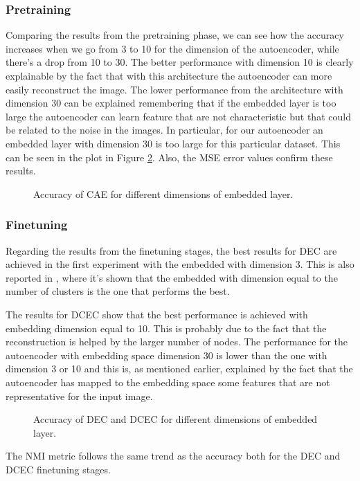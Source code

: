 \subsubsection{Pretraining}

Comparing the results from the pretraining phase, we can see how the accuracy increases when we go from 3 to 10 for the dimension of the autoencoder, while there's a drop from 10 to 30. The better performance with dimension 10 is clearly explainable by the fact that with this architecture the autoencoder can more easily reconstruct the image. The lower performance from the architecture with dimension 30 can be explained remembering that if the embedded layer is too large the autoencoder can learn feature that are not characteristic but that could be related to the noise in the images. In particular, for our autoencoder an embedded layer with dimension 30 is too large for this particular dataset. This can be seen in the plot in Figure \ref{fig:acc_cae}. Also, the MSE error values confirm these results.

\begin{figure}[H]
    \centering
    
    \caption{Accuracy of CAE for different dimensions of embedded layer.}
    \label{fig:acc_cae}
\end{figure}

\subsubsection{Finetuning}

Regarding the results from the finetuning stages, the best results for DEC are achieved in the first experiment with the embedded with dimension 3. This is also reported in \cite{xie2016unsupervised}, where it's shown that the embedded with dimension equal to the number of clusters is the one that performs the best. 

The results for DCEC show that the best performance is achieved with embedding dimension equal to 10. This is probably due to the fact that the reconstruction is helped by the larger number of nodes. The performance for the autoencoder with embedding space dimension 30 is lower than the one with dimension 3 or 10 and this is, as mentioned earlier, explained by the fact that the autoencoder has mapped to the embedding space some features that are not representative for the input image.

\begin{figure}[H]
    \centering
    
    \caption{Accuracy of DEC and DCEC for different dimensions of embedded layer.}
    \label{fig:acc_cae}
\end{figure}

The NMI metric follows the same trend as the accuracy both for the DEC and DCEC finetuning stages.